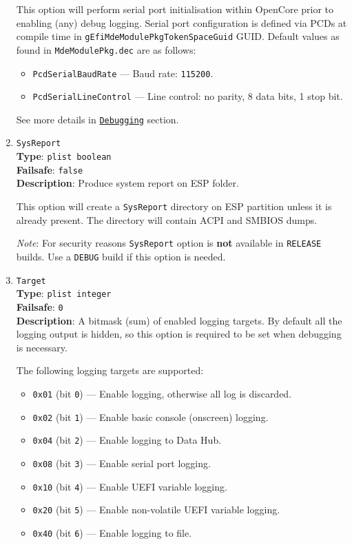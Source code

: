 \documentclass[]{article}
\providecommand{\tightlist}{%
  \setlength{\itemsep}{0pt}\setlength{\parskip}{0pt}}
\begin{document}
\begin{enumerate}
  This option will perform serial port initialisation within OpenCore prior to enabling
  (any) debug logging. Serial port configuration is defined via PCDs at compile time
  in \texttt{gEfiMdeModulePkgTokenSpaceGuid} GUID. Default values as found in
  \texttt{MdeModulePkg.dec} are as follows:

  \begin{itemize}
  \tightlist
    \item \texttt{PcdSerialBaudRate} --- Baud rate: \texttt{115200}.
    \item \texttt{PcdSerialLineControl} --- Line control: no parity, 8 data bits, 1 stop bit.
  \end{itemize}

  See more details in \hyperref[troubleshootingdebug]{\texttt{Debugging}} section.

\item
  \texttt{SysReport}\\
  \textbf{Type}: \texttt{plist\ boolean}\\
  \textbf{Failsafe}: \texttt{false}\\
  \textbf{Description}: Produce system report on ESP folder.

  This option will create a \texttt{SysReport} directory on ESP partition
  unless it is already present. The directory will contain ACPI and SMBIOS dumps.

  \emph{Note}: For security reasons \texttt{SysReport} option is \textbf{not} available
  in \texttt{RELEASE} builds. Use a \texttt{DEBUG} build if this option is needed.

\item
  \texttt{Target}\\
  \textbf{Type}: \texttt{plist\ integer}\\
  \textbf{Failsafe}: \texttt{0}\\
  \textbf{Description}: A bitmask (sum) of enabled logging targets.
  By default all the logging output is hidden, so this option is
  required to be set when debugging is necessary.

  The following logging targets are supported:

  \begin{itemize}
  \tightlist
    \item \texttt{0x01} (bit \texttt{0}) --- Enable logging, otherwise all log is discarded.
    \item \texttt{0x02} (bit \texttt{1}) --- Enable basic console (onscreen) logging.
    \item \texttt{0x04} (bit \texttt{2}) --- Enable logging to Data Hub.
    \item \texttt{0x08} (bit \texttt{3}) --- Enable serial port logging.
    \item \texttt{0x10} (bit \texttt{4}) --- Enable UEFI variable logging.
    \item \texttt{0x20} (bit \texttt{5}) --- Enable non-volatile UEFI variable logging.
    \item \texttt{0x40} (bit \texttt{6}) --- Enable logging to file.
  \end{itemize}


\end{enumerate}
\end{document}
